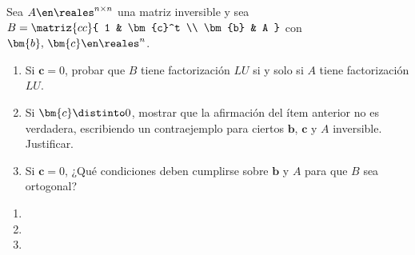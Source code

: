 \begin{enunciado}{\ejExtra} 
  Sea $A \en \reales^{n \times n}$ una matriz inversible y sea
  $B =
    \matriz{cc}{
      1 & \bm{c}^t \\
      \bm{b} & A
  }$ con $\bm{b},\, \bm{c}\en \reales^n$.

  \begin{enumerate}[label=\alph*)]
    \item Si $\bm{c} = 0$, probar que $B$ tiene factorización $LU$ si y solo si $A$ tiene factorización $LU$.

    \item Si $\bm{c} \distinto 0$, mostrar que la afirmación del ítem anterior no es verdadera, escribiendo un contraejemplo para ciertos $\bm{b}$, $\bm{c}$
          y $A$ inversible. Justificar.

      \item Si $\bm{c} = 0$, ¿Qué condiciones deben cumplirse sobre $\bm{b}$ y $A$ para que $B$ sea ortogonal?
  \end{enumerate}
\end{enunciado}
\begin{enumerate}[label=\alph*)]
  \item \hacer
  \item \hacer
  \item \hacer
\end{enumerate}
